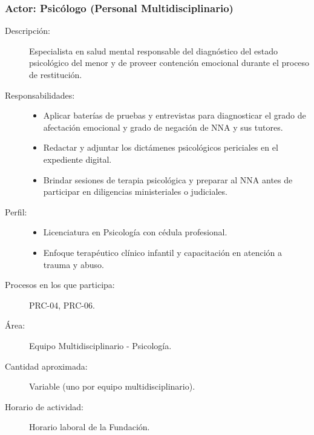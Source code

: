 \subsubsection{Actor: Psicólogo (Personal Multidisciplinario)}
\begin{description}
	\item[Descripción:] Especialista en salud mental responsable del diagnóstico del estado psicológico del menor y de proveer contención emocional durante el proceso de restitución.
	\item[Responsabilidades:] \cdtEmpty
		\begin{itemize}
			\item Aplicar baterías de pruebas y entrevistas para diagnosticar el grado de afectación emocional y grado de negación de NNA y sus tutores.
			\item Redactar y adjuntar los dictámenes psicológicos periciales en el expediente digital.
			\item Brindar sesiones de terapia psicológica y preparar al NNA antes de participar en diligencias ministeriales o judiciales.
		\end{itemize}
	\item[Perfil:] \cdtEmpty
		\begin{itemize}
			\item Licenciatura en Psicología con cédula profesional.
			\item Enfoque terapéutico clínico infantil y capacitación en atención a trauma y abuso.
		\end{itemize}
	\item[Procesos en los que participa:] PRC-04, PRC-06.
	\item[Área:] Equipo Multidisciplinario - Psicología.
	\item[Cantidad aproximada:] Variable (uno por equipo multidisciplinario).
	\item[Horario de actividad:] Horario laboral de la Fundación.
\end{description}

